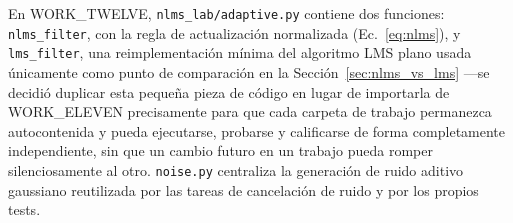 En WORK\_TWELVE, \texttt{nlms\_lab/adaptive.py} contiene dos funciones:
\texttt{nlms\_filter}, con la regla de actualización normalizada
(Ec.~\ref{eq:nlms}), y \texttt{lms\_filter}, una reimplementación
mínima del algoritmo LMS plano usada únicamente como punto de
comparación en la Sección~\ref{sec:nlms_vs_lms} —se decidió duplicar
esta pequeña pieza de código en lugar de importarla de WORK\_ELEVEN
precisamente para que cada carpeta de trabajo permanezca
autocontenida y pueda ejecutarse, probarse y calificarse de forma
completamente independiente, sin que un cambio futuro en un trabajo
pueda romper silenciosamente al otro. \texttt{noise.py} centraliza la
generación de ruido aditivo gaussiano reutilizada por las tareas de
cancelación de ruido y por los propios tests.
